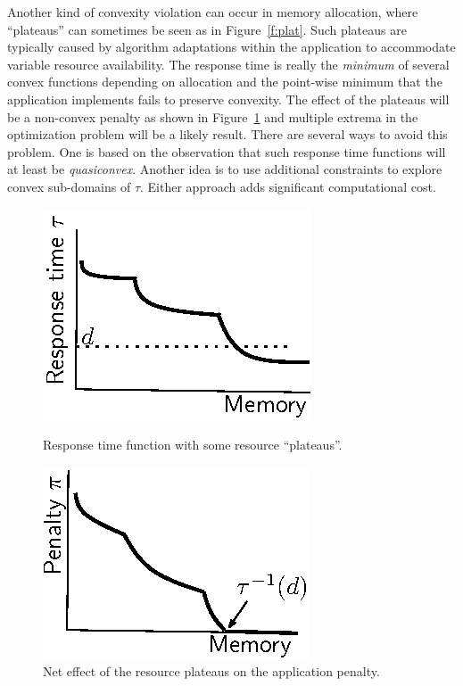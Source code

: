 Another kind of convexity violation can occur in memory allocation, where ``plateaus'' can sometimes be seen as in Figure~\ref{f:plat}. Such plateaus are typically caused by algorithm adaptations within the application to accommodate variable resource availability.  The response time is really the \emph{minimum} of several convex functions depending on allocation and the point-wise minimum that the application implements fails to preserve convexity.  The effect of the plateaus will be a non-convex penalty as shown in Figure~\ref{f:plateffect} and multiple extrema in the optimization problem will be a likely result. There are several ways to avoid this problem.  One is based on the observation that such response time functions will at least be \emph{quasiconvex}.  Another idea is to use additional constraints to explore convex sub-domains of $\tau$. Either approach adds significant computational cost.

\begin{figure}[hb]
\parbox{1.6in}{
\includegraphics*{Plateau1.eps}
\caption{\label{f:plat}Response time function with some resource ``plateaus''.}
}
\hspace{\fill}
\parbox{1.6in}{
\includegraphics*{Plateau2.eps}
\caption{\label{f:plateffect}Net effect of the resource plateaus on the application penalty.}
}
\end{figure}


